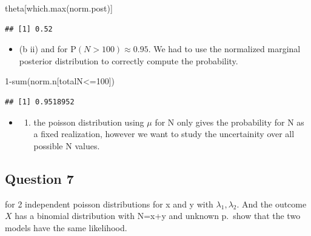 \documentclass[
]{book}
\newenvironment{Shaded}{\begin{snugshade}}{\end{snugshade}}
\newcommand{\DecValTok}[1]{\textcolor[rgb]{0.00,0.00,0.81}{#1}}
\newcommand{\FunctionTok}[1]{\textcolor[rgb]{0.00,0.00,0.00}{#1}}
\newcommand{\NormalTok}[1]{#1}
\newcommand{\SpecialCharTok}[1]{\textcolor[rgb]{0.00,0.00,0.00}{#1}}
\providecommand{\tightlist}{%
  \setlength{\itemsep}{0pt}\setlength{\parskip}{0pt}}
\theoremstyle{definition}
\theoremstyle{definition}
\theoremstyle{definition}
\theoremstyle{definition}
\theoremstyle{remark}
\begin{document}
\begin{Shaded}
\begin{Highlighting}[]
\NormalTok{  theta[}\FunctionTok{which.max}\NormalTok{(norm.post)]}
\end{Highlighting}
\end{Shaded}

\begin{verbatim}
## [1] 0.52
\end{verbatim}

\begin{itemize}
\tightlist
\item
  (b ii) and for P\((N>100) \approx 0.95\). We had to use the normalized marginal posterior distribution to correctly compute the probability.
\end{itemize}

\begin{Shaded}
\begin{Highlighting}[]
\DecValTok{1}\SpecialCharTok{{-}}\FunctionTok{sum}\NormalTok{(norm.n[totalN}\SpecialCharTok{\textless{}=}\DecValTok{100}\NormalTok{])}
\end{Highlighting}
\end{Shaded}

\begin{verbatim}
## [1] 0.9518952
\end{verbatim}

\begin{itemize}
\item
  \begin{enumerate}
  \def\labelenumi{(\alph{enumi})}
  \setcounter{enumi}{3}
  \tightlist
  \item
    the poisson distribution using \(\mu\) for N only gives the probability for N as a fixed realization, however we want to study the uncertainity over all possible N values.
  \end{enumerate}
\end{itemize}

\hypertarget{question-7-1}{%
\subsection*{Question 7}\label{question-7-1}}

for 2 independent poisson distributions for x and y with \(\lambda_1,\lambda_2\). And the outcome \(X\) has a binomial distribution with N=x+y and unknown p.~show that the two models have the same likelihood.
\end{document}
